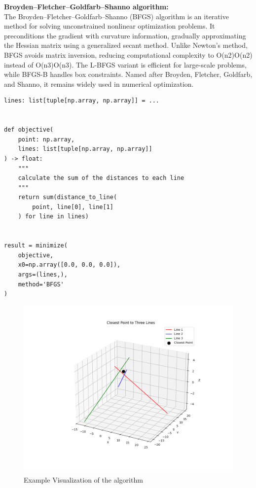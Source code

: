 \textbf{Broyden–Fletcher–Goldfarb–Shanno algorithm:} \\
The Broyden–Fletcher–Goldfarb–Shanno (BFGS) algorithm is an iterative method for solving unconstrained nonlinear optimization problems. It preconditions the gradient with curvature information, gradually approximating the Hessian matrix using a generalized secant method. Unlike Newton’s method, BFGS avoids matrix inversion, reducing computational complexity to O(n2)O(n2) instead of O(n3)O(n3). The L-BFGS variant is efficient for large-scale problems, while BFGS-B handles box constraints. Named after Broyden, Fletcher, Goldfarb, and Shanno, it remains widely used in numerical optimization.\citep{BFGS_wiki}

\hspace*{-1.2cm}

\begin{lstlisting}[style=PythonStyle]
lines: list[tuple[np.array, np.array]] = ...


def objective(
	point: np.array,
	lines: list[tuple[np.array, np.array]]
) -> float:
	"""
	calculate the sum of the distances to each line
	"""
	return sum(distance_to_line(
		point, line[0], line[1]
	) for line in lines)


result = minimize(
	objective,
	x0=np.array([0.0, 0.0, 0.0]),
	args=(lines,),
	method='BFGS'
)
\end{lstlisting}

\begin{figure}[H]
	\centering
	\hspace*{-1.5cm} 
	\includegraphics[width=400pt]{figures/approximation_algorithm}
	\caption{Example Visualization of the algorithm}
	\label{fig:approximationalgorithm}
\end{figure}

